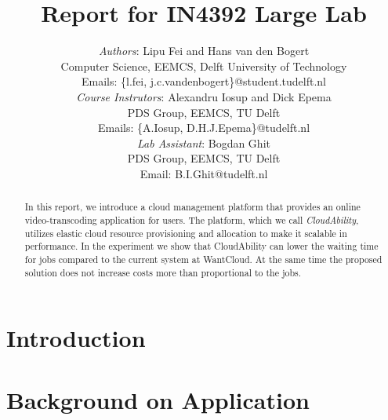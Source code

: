 \documentclass[10pt, a4paper, twoside, twocolumn, technote]{IEEEtran}
\begin{document}
\newcommand{\staterunning}
  {\textsc{running}}
\newcommand{\statepending}
  {\textsc{pending}}
  
\newcommand{\statefinished}
  {\textsc{finished}}
\newcommand{\statefailed}
  {\textsc{failed}}
  
\newcommand{\policystatic}
  {\textsc{static}}
\newcommand{\policysimpleelastic}
  {\textsc{simple elastic}}


\title{Report for IN4392 Large Lab}
\author{\textit{Authors}: Lipu Fei and Hans van den Bogert\\
  Computer Science, EEMCS, Delft University of Technology\\
  Emails: \{l.fei, j.c.vandenbogert\}@student.tudelft.nl\\
  \textit{Course Instrutors}: Alexandru Iosup and Dick Epema\\
  PDS Group, EEMCS, TU Delft\\
  Emails: \{A.Iosup, D.H.J.Epema\}@tudelft.nl\\
  \textit{Lab Assistant}: Bogdan Ghit\\
  PDS Group, EEMCS, TU Delft\\
  Email: B.I.Ghit@tudelft.nl}

\maketitle

\begin{abstract}
  In this report, we introduce a cloud management platform that
  provides an online video-transcoding application for users. The
  platform, which we call \emph{CloudAbility}, utilizes elastic cloud
  resource provisioning and allocation to make it scalable in
  performance. In the experiment we show that CloudAbility can lower
  the waiting time for jobs compared to the current system at
  WantCloud. At the same time the proposed solution does not increase
  costs more than proportional to the jobs.
\end{abstract}

\section{Introduction}


\section{Background on Application}\label{background}

\end{document}
